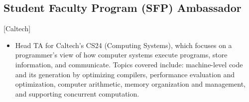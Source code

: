\documentclass{mycv}
\begin{document}
\subsection{Student Faculty Program (SFP) Ambassador}[Caltech]
\begin{itemize}
  \item Head TA for Caltech’s CS24 (Computing Systems), which focuses on a programmer’s view of how computer systems execute programs, store information, and communicate. Topics covered include: machine-level code and its generation by optimizing compilers, performance evaluation and optimization, computer arithmetic, memory organization and management, and supporting concurrent computation.
\end{itemize}
\end{document}
